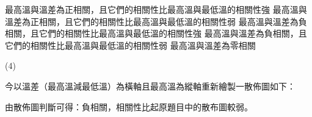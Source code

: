 \begin{QUESTIONS}
\begin{QUESTION}
\begin{QBODY}
			\begin{QOPS}
				\QOP 最高溫與溫差為正相關，且它們的相關性比最高溫與最低溫的相關性強
				\QOP 最高溫與溫差為正相關，且它們的相關性比最高溫與最低溫的相關性弱
				\QOP 最高溫與溫差為負相關，且它們的相關性比最高溫與最低溫的相關性強
				\QOP 最高溫與溫差為負相關，且它們的相關性比最高溫與最低溫的相關性弱
				\QOP 最高溫與溫差為零相關
			\end{QOPS}
        \end{QBODY}
        \begin{QFROMS}
        \end{QFROMS}
        \begin{QTAGS}\end{QTAGS}
        \begin{QANS}
            (4)
        \end{QANS}
        \begin{QSOLLIST}
            \begin{QSOL}
                今以溫差（最高溫減最低溫）為橫軸且最高溫為縱軸重新繪製一散佈圖如下：
                
                由散佈圖判斷可得：負相關，相關性比起原題目中的散布圖較弱。
            \end{QSOL}
        

\end{QSOLLIST}
\end{QUESTION}
\end{QUESTIONS}
